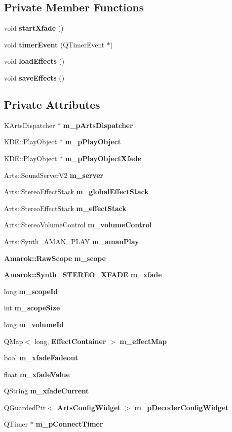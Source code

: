 \subsection*{Private Member Functions}
\begin{CompactItemize}
\item 
void {\bf start\-Xfade} ()
\item 
void {\bf timer\-Event} (QTimer\-Event $\ast$)
\item 
void {\bf load\-Effects} ()
\item 
void {\bf save\-Effects} ()
\end{CompactItemize}
\subsection*{Private Attributes}
\begin{CompactItemize}
\item 
KArts\-Dispatcher $\ast$ {\bf m\_\-p\-Arts\-Dispatcher}
\item 
KDE::Play\-Object $\ast$ {\bf m\_\-p\-Play\-Object}
\item 
KDE::Play\-Object $\ast$ {\bf m\_\-p\-Play\-Object\-Xfade}
\item 
Arts::Sound\-Server\-V2 {\bf m\_\-server}
\item 
Arts::Stereo\-Effect\-Stack {\bf m\_\-global\-Effect\-Stack}
\item 
Arts::Stereo\-Effect\-Stack {\bf m\_\-effect\-Stack}
\item 
Arts::Stereo\-Volume\-Control {\bf m\_\-volume\-Control}
\item 
Arts::Synth\_\-AMAN\_\-PLAY {\bf m\_\-aman\-Play}
\item 
{\bf Amarok::Raw\-Scope} {\bf m\_\-scope}
\item 
{\bf Amarok::Synth\_\-STEREO\_\-XFADE} {\bf m\_\-xfade}
\item 
long {\bf m\_\-scope\-Id}
\item 
int {\bf m\_\-scope\-Size}
\item 
long {\bf m\_\-volume\-Id}
\item 
QMap$<$ long, {\bf Effect\-Container} $>$ {\bf m\_\-effect\-Map}
\item 
bool {\bf m\_\-xfade\-Fadeout}
\item 
float {\bf m\_\-xfade\-Value}
\item 
QString {\bf m\_\-xfade\-Current}
\item 
QGuarded\-Ptr$<$ {\bf Arts\-Config\-Widget} $>$ {\bf m\_\-p\-Decoder\-Config\-Widget}
\item 
QTimer $\ast$ {\bf m\_\-p\-Connect\-Timer}
\end{CompactItemize}
